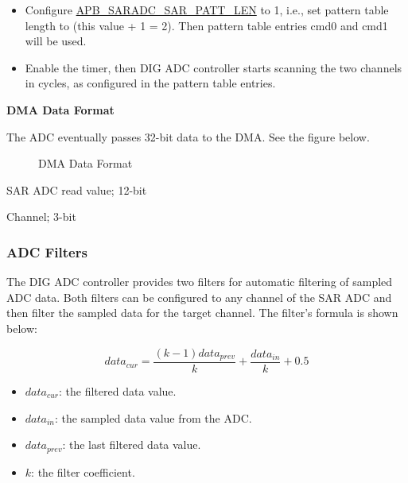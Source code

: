 \documentclass[main\_\_EN.tex]{subfiles}
\begin{document}
\begin{itemize}
    \item Configure \hyperref[fielddesc:APBSARADCSARPATTLEN]{APB\_SARADC\_SAR\_PATT\_LEN} to 1, i.e., set pattern table length to (this value + 1 = 2). Then pattern table entries cmd0 and cmd1 will be used. 
    \item Enable the timer, then DIG ADC controller starts scanning the two channels in cycles, as configured in the pattern table entries.
\end{itemize}

\textbf{DMA Data Format}

The ADC eventually passes 32-bit data to the DMA. See the figure below.

\begin{figure}[H]
\centering
{}%
%
%
%
%
\end{figure}
\vspace{-2em}
\begin{figure}[H]
    \centering
    \caption{DMA Data Format}
    \label{fig:sensor-dma-data-format}
\end{figure}
\vspace{-2em}
\begin{regdesc}\begin{reglist}
\item [data] SAR ADC read value; 12-bit
\item [ch\_sel] Channel; 3-bit
\end{reglist}\end{regdesc}


\subsubsection{ADC Filters}
The DIG ADC controller provides two filters for automatic filtering of sampled ADC data. Both filters can be configured to any channel of the SAR ADC and then filter the sampled data for the target channel. The filter's formula is shown below:

\[data_{cur} = \frac{(k-1)data_{prev}}{k}+\frac{data_{in}}{k}+0.5\]

\begin{itemize}
    \item \(data_{cur}\): the filtered data value.
    \item \(data_{in}\): the sampled data value from the ADC.
    \item \(data_{prev}\): the last filtered data value.
    \item \(k\): the filter coefficient.
\end{itemize}
\end{document}
